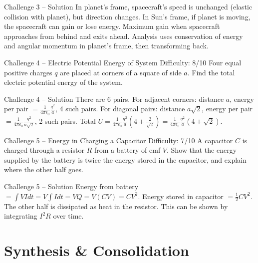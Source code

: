 \documentclass[11pt]{beamer}
\begin{document}
\begin{frame}{Challenge 3 – Solution}
In planet's frame, spacecraft's speed is unchanged (elastic collision with planet), but direction changes. In Sun's frame, if planet is moving, the spacecraft can gain or lose energy. Maximum gain when spacecraft approaches from behind and exits ahead. Analysis uses conservation of energy and angular momentum in planet's frame, then transforming back.
\end{frame}

\begin{frame}[shrink=15]{Challenge 4 – Electric Potential Energy of System \hfill Difficulty: 8/10}
Four equal positive charges $q$ are placed at corners of a square of side $a$. Find the total electric potential energy of the system.
\end{frame}

\begin{frame}{Challenge 4 – Solution}
There are $6$ pairs. For adjacent corners: distance $a$, energy per pair $= \frac{1}{4\pi\epsilon_0}\frac{q^2}{a}$, 4 such pairs. For diagonal pairs: distance $a\sqrt{2}$, energy per pair $= \frac{1}{4\pi\epsilon_0}\frac{q^2}{a\sqrt{2}}$, 2 such pairs. Total $U = \frac{1}{4\pi\epsilon_0}\frac{q^2}{a}\left(4 + \frac{2}{\sqrt{2}}\right) = \frac{1}{4\pi\epsilon_0}\frac{q^2}{a}\left(4 + \sqrt{2}\right)$.
\end{frame}

\begin{frame}[shrink=15]{Challenge 5 – Energy in Charging a Capacitor \hfill Difficulty: 7/10}
A capacitor $C$ is charged through a resistor $R$ from a battery of emf $V$. Show that the energy supplied by the battery is twice the energy stored in the capacitor, and explain where the other half goes.
\end{frame}

\begin{frame}{Challenge 5 – Solution}
Energy from battery $= \int V I dt = V \int I dt = V Q = V (CV) = CV^2$.
Energy stored in capacitor $= \frac12 CV^2$.
The other half is dissipated as heat in the resistor. This can be shown by integrating $I^2 R$ over time.
\end{frame}

\section{Synthesis \& Consolidation}
\end{document}
